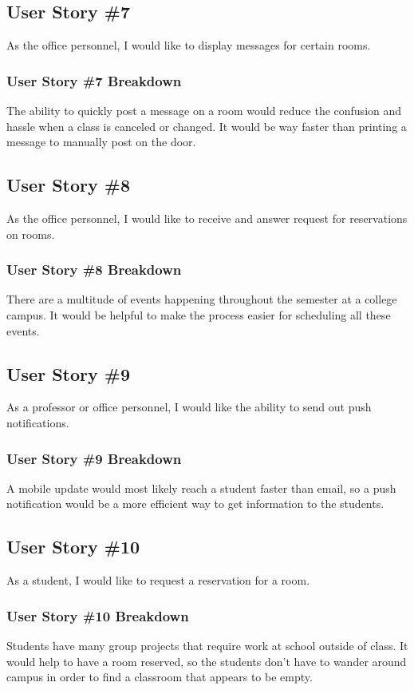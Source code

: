 \subsection{User Story \#7} 
As the office personnel, I would like to display messages for certain rooms.
\subsubsection{User Story \#7 Breakdown}
The ability to quickly post a message on a room would reduce the confusion and hassle when a class is canceled or changed.  It would be way faster than printing a message to manually post on the door.

\subsection{User Story \#8} 
As the office personnel, I would like to receive and answer request for reservations on rooms. 
\subsubsection{User Story \#8 Breakdown}
There are a multitude of events happening throughout the semester at a college campus.  It would be helpful to make the process easier for scheduling all these events.

\subsection{User Story \#9} 
As a professor or office personnel, I would like the ability to send out push notifications. 
\subsubsection{User Story \#9 Breakdown}
A mobile update would most likely reach a student faster than email, so a push notification would be a more efficient way to get information to the students. 

\subsection{User Story \#10} 
As a student, I would like to request a reservation for a room.  
\subsubsection{User Story \#10 Breakdown}
Students have many group projects that require work at school outside of class.  It would help to have a room reserved, so the students don't have to wander around campus in order to find a classroom that appears to be empty.

